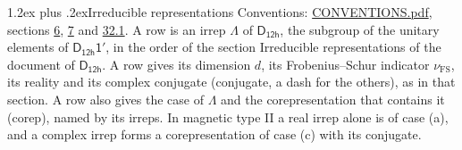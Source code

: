 \documentclass[10pt,a4paper]{article}
\makeatletter
\renewcommand\section{\@startsection{section}{1}{\z@}{-3ex plus -1ex minus -.2ex}%
  {1.2ex plus .2ex}{\normalfont\large\sffamily\bfseries\color{parttitle}}}
\numberwithin{equation}{section}
\newcommand{\grp}[1]{\mathsf{#1}}
\newcommand{\fsind}{\nu_{\mathrm{FS}}}
\makeatother
\begin{document}
\section{Irreducible representations}\label{s:irreps}
Conventions: \href{../../CONVENTIONS.pdf}{CONVENTIONS.pdf}, sections \href{../../../rotation/CONVENTIONS.pdf\#conv.6}{6}, \href{../../../rotation/CONVENTIONS.pdf\#conv.7}{7} and \href{../../CONVENTIONS.pdf\#conv.32.1}{32.1}.
\leavevmode\label{n:irrep.Delta}A row is an irrep $\Lambda$ of $\grp{D_{12h}}$, the subgroup of the unitary elements of $\grp{D_{12h}1'}$, in the order of the section Irreducible representations of the document of \href{../../../rotation/data/pdf/D12h.pdf}{$\grp{D_{12h}}$}. \label{n:index.dimension}\label{n:index.frobenius}\label{n:head.irrep}\label{n:head.reality}\label{n:head.conjugate}A row gives its dimension $d$, its Frobenius--Schur indicator $\fsind$, its reality and its complex conjugate (conjugate, a dash for the others), as in that section. \label{n:head.case.corep}\label{n:head.corep}A row also gives the case of $\Lambda$ and the corepresentation that contains it (corep), named by its irreps. In magnetic type II a real irrep alone is of case (a), and a complex irrep forms a corepresentation of case (c) with its conjugate.
\setlength{\emergencystretch}{2em}\par\setlength{\emergencystretch}{0pt}
\end{document}
